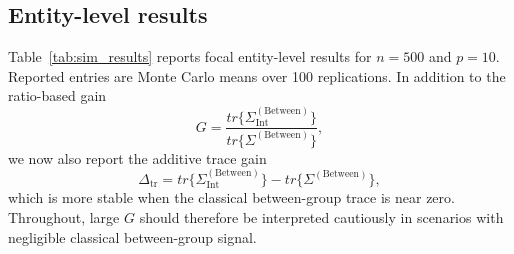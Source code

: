 \documentclass[preprint, times, 12pt, authoryear]{elsarticle}
\begin{document}
\subsection{Entity-level results}\label{sec:sim_level_i}

Table~\ref{tab:sim_results} reports focal entity-level results for $n=500$ and $p=10$. Reported entries are Monte Carlo means over 100 replications. In addition to the ratio-based gain
\[
G=\frac{tr\{\Sigma_{\mathrm{Int}}^{(\mathrm{Between})}\}}{tr\{\Sigma^{(\mathrm{Between})}\}},
\]
we now also report the additive trace gain
\[
\Delta_{\mathrm{tr}}=tr\{\Sigma_{\mathrm{Int}}^{(\mathrm{Between})}\}-tr\{\Sigma^{(\mathrm{Between})}\},
\]
which is more stable when the classical between-group trace is near zero. Throughout, large $G$ should therefore be interpreted cautiously in scenarios with negligible classical between-group signal.
\end{document}

